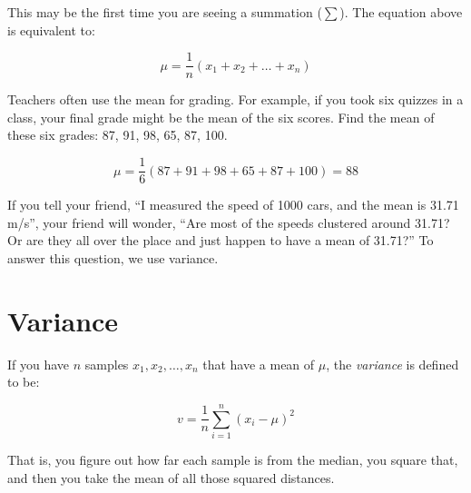 This may be the first time you are seeing a summation ($\sum$). The equation above is equivalent to:

$$ \mu = \frac{1}{n} \left(x_1 + x_2 + \ldots + x_n\right)$$

\begin{Exercise}[title={Mean Grade}, label=grades_mean]

  Teachers often use the mean for grading. For example, if you took
  six quizzes in a class, your final grade might be the mean of the six
  scores. Find the mean of these six grades: 87, 91, 98, 65, 87, 100.

\end{Exercise}
\begin{Answer}[ref=grades_mean]

  $$\mu =\frac{1}{6} \left(87 + 91 + 98 + 65 + 87 + 100 \right) = 88$$

\end{Answer}

If you tell your friend, ``I measured the speed of 1000 cars, and the
mean is 31.71 m/s'', your friend will wonder, ``Are most of the speeds
clustered around 31.71? Or are they all over the place and just happen
to have a mean of 31.71?'' To answer this question, we use variance.

\section{Variance}

\begin{mdframed}[style=important, frametitle={Definition of Variance}]

If you have $n$ samples $x_1, x_2, \ldots, x_n$ that have a mean of $\mu$, the \textit{variance} is defined to be:

$$v = \frac{1}{n}\sum_{i = 1}^{n} \left(x_i - \mu\right)^2$$
\end{mdframed}

That is, you figure out how far each sample is from the median, you
square that, and then you take the mean of all those squared
distances.


